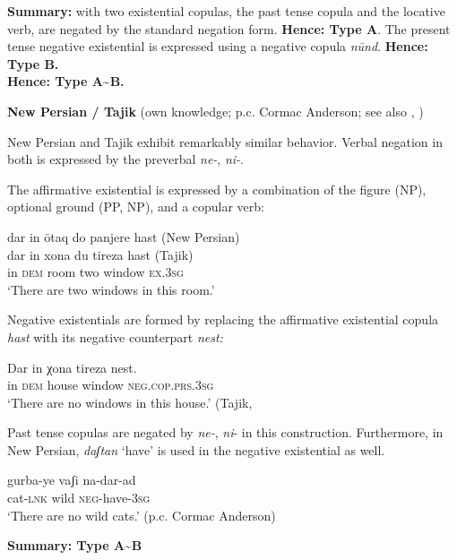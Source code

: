 ﻿\documentclass[output=paper]{langsci/langscibook}
\begin{document}
\begin{unindented}
\textbf{Summary:} with two existential copulas, the past tense copula and
the locative verb, are negated by the standard negation form.
\textbf{Hence: Type A}. The present tense negative existential is expressed
using a negative copula \textit{nūnd}. \textbf{Hence: Type B.}\\
\textbf{Hence: Type A{\textasciitilde}B.}

\textbf{New Persian / Tajik} (own knowledge; p.c. Cormac Anderson; see also
\citealt{Perry2005}, \citealt{WindfuhrPerry2009})

New Persian and Tajik exhibit remarkably similar behavior. Verbal negation in both is expressed by the preverbal \textit{ne-}, \textit{ni-}. 

The affirmative existential is expressed by a combination of the figure (NP), optional ground (PP, NP), and a copular verb:
%
\begin{exe}\ex
    \glll dar in ōtaq   do   panjere  hast    (New Persian) \\
dar in       xona  du   tireza     hast    (Tajik) \\
in    \textsc{dem}  room  two window \textsc{ex.3sg}\\
    \glt `There are two windows in this room.' \parencite[450]{WindfuhrPerry2009}
    \end{exe}

Negative existentials are formed by replacing the affirmative existential copula \textit{hast} with its negative counterpart \textit{nest:} 
%
\begin{exe}\ex
    \gll Dar  in       χona    tireza     nest. \\
in     \textsc{dem}   house   window \textsc{neg.cop.prs.3sg} \\
    \glt `There are no windows in this house.' (Tajik, \citealt[202]{Perry2005}
    \end{exe}

Past tense copulas are negated by \textit{ne-}, \textit{ni}- in this construction. Furthermore, in New Persian, \textit{daʃtan} `have' is used in the negative existential as well.
%
\begin{exe}\ex
    \gll gurba-ye vaʃi  na-dar-ad \\
cat-\textsc{lnk}   wild \textsc{neg}-have-\textsc{3sg} \\
    \glt `There are no wild cats.' (p.c. Cormac Anderson)
    \end{exe}

\textbf{Summary: Type A{\textasciitilde}B}


\end{unindented}
\end{document}
